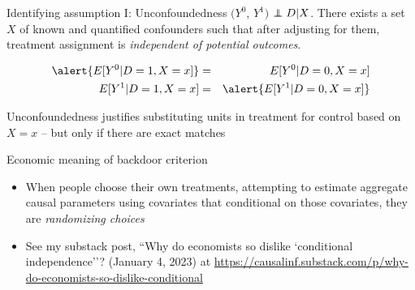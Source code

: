 \documentclass{beamer}
\newcommand\independent{\protect\mathpalette{\protect\independenT}{\perp}}
\def\independenT#1#2{\mathrel{\rlap{$#1#2$}\mkern2mu{#1#2}}}
\begin{document}
\begin{frame}[plain]

	\begin{block}{Identifying assumption I: Unconfoundedness}
	$(Y^0$, $Y^1)$ $\independent{D} | X$. There exists a set $X$ of known and quantified confounders such that after adjusting for them, treatment assignment is \emph{independent of potential outcomes}.
	\end{block}
	
	\begin{eqnarray*}
	\alert{E[Y^0 | D=1, X=x]} &=& E[Y^0 | D=0, X=x] \\
	E[Y^1 | D=1, X=x] &=& \alert{E[Y^1 | D=0, X=x] }
	\end{eqnarray*}
	
Unconfoundedness justifies substituting units in treatment for control based on $X=x$ -- but only if there are exact matches
	
	
\end{frame}

\begin{frame}{Economic meaning of backdoor criterion}

\begin{itemize}
\item When people choose their own treatments, attempting to estimate aggregate causal parameters using covariates that conditional on those covariates, they are \emph{randomizing choices}
\item See my substack post, ``Why do economists so dislike `conditional independence''? (January 4, 2023) at \url{https://causalinf.substack.com/p/why-do-economists-so-dislike-conditional}
\end{itemize}

\end{frame}
\end{document}
